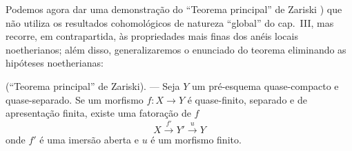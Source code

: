 \begin{env}[8.12.5]
\label{IV.8.12.5}
Podemos agora dar uma demonstração do ``Teorema principal'' de Zariski ) que não utiliza os resultados cohomológicos de natureza ``global'' do cap.~III, mas recorre, em contrapartida, às propriedades mais finas dos anéis locais noetherianos; além disso, generalizaremos o enunciado do teorema eliminando as hipóteses noetherianas:
\end{env}

\begin{theorem}[8.12.6]
\label{IV.8.12.6}
(``Teorema principal'' de Zariski). --- Seja $Y$ um pré-esquema quase-compacto e quase-separado.
Se um morfismo $f:X\to Y$ é quase-finito, separado e de apresentação finita, existe uma fatoração de $f$
\begin{equation}
\label{IV.8.12.6.1}
X\xrightarrow{f'}Y'\xrightarrow{u}Y \tag{8.12.6.1}
\end{equation}
onde $f'$ é uma imersão aberta e $u$ é um morfismo finito.
\end{theorem}


